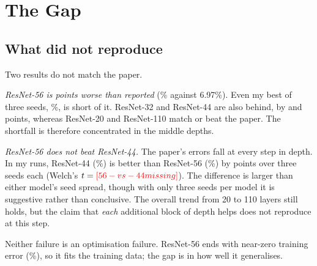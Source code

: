 \documentclass[conference]{IEEEtran}
\begin{document}
\begin{table}[t]
\caption{ResNet-44 and ResNet-56 runs used to investigate the gap (test error, \%)}
\label{tab:var}
\centering
\footnotesize
\resizebox{\linewidth}{!}{}
\end{table}

\section{The Gap}
\label{sec:gap}
\subsection{What did not reproduce}
Two results do not match the paper.

\emph{ResNet-56 is  points worse than reported} (\% against 6.97\%). Even my best of three seeds, \%, is short of it. ResNet-32 and ResNet-44 are also behind, by  and  points, whereas ResNet-20 and ResNet-110 match or beat the paper. The shortfall is therefore concentrated in the middle depths.

\emph{ResNet-56 does not beat ResNet-44.} The paper's errors fall at every step in depth. In my runs, ResNet-44 (\%) is better than ResNet-56 (\%) by  points over three seeds each (Welch's $t=\cmpt{56-vs-44}$). The difference is larger than either model's seed spread, though with only three seeds per model it is suggestive rather than conclusive. The overall trend from 20 to 110 layers still holds, but the claim that \emph{each} additional block of depth helps does not reproduce at this step.

Neither failure is an optimisation failure. ResNet-56 ends with near-zero training error (\%), so it fits the training data; the gap is in how well it generalises.
\end{document}
